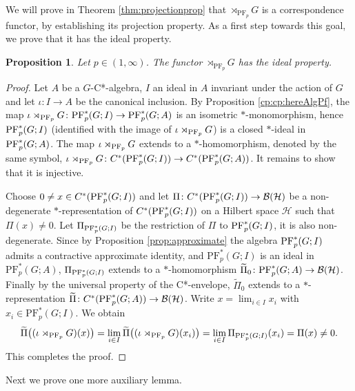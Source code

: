 \documentclass[12pt]{amsart}
\newtheorem{prop}[thm]{Proposition}
\theoremstyle{definition}
\theoremstyle{remark}
\numberwithin{equation}{section}
\newcommand{\cpf}{\rtimes_{\textup{PF}_p} G}
\newcommand{\mc}{\mathcal}
\newcommand{\PF}[3]{\ensuremath{\mathrm{PF}_{#1}^*\left(#2; #3\right)}}
\begin{document}
We will prove in Theorem \ref{thm:projectionprop} that $\rtimes_{\mathrm{PF}_p} G$ is a correspondence functor, by establishing its projection property. As a first step towards this goal, we prove that it has the ideal property. 

\begin{prop}
	Let $p \in (1, \infty)$. The functor $\rtimes_{\mathrm{PF}_p}G$ has the ideal property.
\end{prop}
\begin{proof}
	Let $A$ be a $G$-C*-algebra, $I$ an ideal in $A$ invariant under the action of $G$ and let
	$\iota\colon I \to A$ be the canonical inclusion. By Proposition \ref{cp:cp:hereAlgPf}, the map $\iota \cpf \colon \textup{PF}_p^*(G;I)
	\to \textup{PF}^*_p(G;A)$ is an isometric $*$-monomorphism, hence $\textup{PF}_p^*(G;I)$ (identified with the image of $\iota\cpf$)	is a closed $*$-ideal in $\textup{PF}_p^*(G;A)$. The map $\iota \cpf$ extends to a $*$-homomorphism, denoted by the same symbol, $\iota \cpf\colon C^*(\textup{PF}_p^*(G;I))\to C^*(\textup{PF}_p^*(G;A))$. It remains to show that it is injective.

Choose $0\neq x\in C^*(\textup{PF}_p^*(G;I))$ and let $\Pi\colon C^*(\textup{PF}_p^*(G;I))\to \mc{B}(\mathcal{H})$ be a non-degenerate $*$-representation of $C^*(\textup{PF}_p^*(G;I))$ on a Hilbert space $\mathcal{H}$ such that $\Pi(x)\neq 0$. Let $\Pi_{\textup{PF}_p^*(G;I)}$ be the restriction of $\Pi$ to $\textup{PF}_p^*(G;I)$, it is also non-degenerate. Since by Proposition \ref{prop:approximate} the algebra $\textup{PF}_p^*(G;I)$ admits a contractive approximate identity, and $\PF{p}{G}{I}$ is an ideal in $\PF{p}{G}{A}$, $\Pi_{\textup{PF}_p^*(G;I)}$ extends to a $*$-homomorphism $\widetilde{\Pi}_0\colon  \textup{PF}_p^*(G;A)\rightarrow \mc{B}(\mathcal{H})$. Finally by the universal property of the C*-envelope, $\widetilde{\Pi}_0$ extends to a $*$-representation $\widetilde{\Pi}\colon C^*(\textup{PF}_p^*(G;A))\rightarrow \mc{B}(\mc{H})$. Write $x=\lim_{i\in I} x_i$ with $x_i\in \PF{p}{G}{I}$. We obtain
\[
\widetilde{\Pi}\bigl( (\iota\rtimes_{\textup{PF}_p}G)(x)\bigr)=
\lim_{i\in I}
\widetilde{\Pi}\bigl( (\iota\rtimes_{\textup{PF}_p}G)(x_i)\bigr)=
\lim_{i\in I}
\Pi_{\PF{p}{G}{I}}(x_i)=\Pi(x)\neq 0.
\]
This completes the proof.
\end{proof}

Next we prove one more auxiliary lemma.
\end{document}

